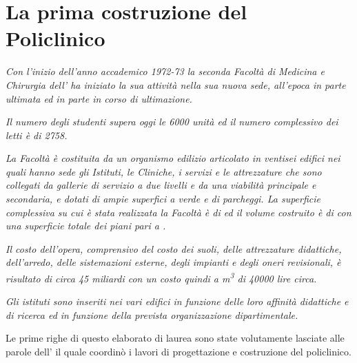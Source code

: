 \chapter{La prima costruzione del Policlinico}
\thispagestyle{empty}
\begin{quoting}
	\emph{Con l'inizio dell'anno accademico 1972-73 la seconda Facoltà di Medicina e Chirurgia dell'\uni{} ha iniziato la sua attività nella sua nuova sede, all'epoca in parte ultimata ed in parte in corso di ultimazione.}
	
	\emph{Il numero degli studenti supera oggi le \num{6000} unità ed il numero complessivo dei letti è di \num{2758}.}

\emph{La Facoltà è costituita da un organismo edilizio articolato in ventisei edifici nei quali hanno sede gli Istituti, le Cliniche, i servizi e le attrezzature che sono collegati da gallerie di servizio a due livelli e da una viabilità principale e secondaria, e dotati di ampie superfici a verde e di parcheggi. La superficie complessiva su cui è stata realizzata la Facoltà è di  ed il volume costruito è di  con una superficie totale dei piani pari a .}

\emph{Il costo dell'opera, comprensivo del costo dei suoli, delle attrezzature didattiche, dell'arredo, delle sistemazioni esterne, degli impianti e degli oneri revisionali, è risultato di circa \num{45} miliardi con un costo quindi a \si{m^3} di \num{40000} lire circa.}

\emph{Gli istituti sono inseriti nei vari edifici in funzione delle loro affinità didattiche e di ricerca ed in funzione della prevista organizzazione dipartimentale.}

\end{quoting}
\noindent Le prime righe di questo elaborato di laurea sono state volutamente lasciate alle parole dell' il quale coordinò i lavori di progettazione e costruzione del policlinico. 

